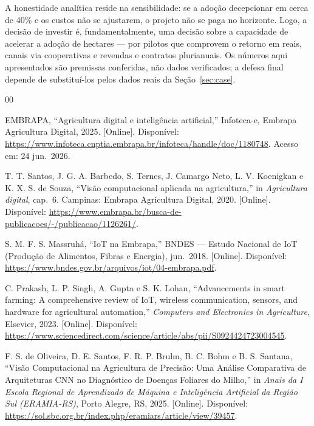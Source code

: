 \documentclass[conference]{IEEEtran}
\begin{document}
A honestidade analítica reside na sensibilidade: se a adoção decepcionar em cerca de 40\% e os custos não se ajustarem, o projeto não se paga no horizonte. Logo, a decisão de investir é, fundamentalmente, uma decisão sobre a capacidade de acelerar a adoção de hectares --- por pilotos que comprovem o retorno em reais, canais via cooperativas e revendas e contratos plurianuais. Os números aqui apresentados são premissas conferidas, não dados verificados; a defesa final depende de substituí-los pelos dados reais da Seção~\ref{sec:case}.

\begin{thebibliography}{00}
\footnotesize

 EMBRAPA, ``Agricultura digital e inteligência artificial,'' Infoteca-e, Embrapa Agricultura Digital, 2025. [Online]. Disponível: \url{https://www.infoteca.cnptia.embrapa.br/infoteca/handle/doc/1180748}. Acesso em: 24 jun.\ 2026.

 T. T. Santos, J. G. A. Barbedo, S. Ternes, J. Camargo Neto, L. V. Koenigkan e K. X. S. de Souza, ``Visão computacional aplicada na agricultura,'' in \textit{Agricultura digital}, cap.~6. Campinas: Embrapa Agricultura Digital, 2020. [Online]. Disponível: \url{https://www.embrapa.br/busca-de-publicacoes/-/publicacao/1126261/}.

 S. M. F. S. Massruhá, ``IoT na Embrapa,'' BNDES --- Estudo Nacional de IoT (Produção de Alimentos, Fibras e Energia), jun.\ 2018. [Online]. Disponível: \url{https://www.bndes.gov.br/arquivos/iot/04-embrapa.pdf}.

 C. Prakash, L. P. Singh, A. Gupta e S. K. Lohan, ``Advancements in smart farming: A comprehensive review of IoT, wireless communication, sensors, and hardware for agricultural automation,'' \textit{Computers and Electronics in Agriculture}, Elsevier, 2023. [Online]. Disponível: \url{https://www.sciencedirect.com/science/article/abs/pii/S0924424723004545}.

 F. S. de Oliveira, D. E. Santos, F. R. P. Bruhn, B. C. Bohm e B. S. Santana, ``Visão Computacional na Agricultura de Precisão: Uma Análise Comparativa de Arquiteturas CNN no Diagnóstico de Doenças Foliares do Milho,'' in \textit{Anais da I Escola Regional de Aprendizado de Máquina e Inteligência Artificial da Região Sul (ERAMIA-RS)}, Porto Alegre, RS, 2025. [Online]. Disponível: \url{https://sol.sbc.org.br/index.php/eramiars/article/view/39457}.


\end{thebibliography}
\end{document}
